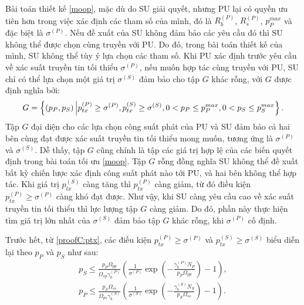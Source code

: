 \documentclass[../main.tex]{subfiles}
\begin{document}
Bài toán thiết kế \eqref{moop}, mặc dù do SU giải quyết, nhưng PU lại có quyền ưu tiên hơn trong việc xác định các tham số của mình, đó là $R_b^{(P)}$, $R_s^{(P)}$, $p_P^{max}$ và đặc biệt là $\sigma^{(P)}$. Nếu đề xuất của SU không đảm bảo các yêu cầu đó thì SU không thể được chọn cùng truyền với PU. Do đó, trong bài toán thiết kế của mình, SU không thể tùy ý lựa chọn các tham số. Khi PU xác định trước yêu cầu về xác suất truyền tin tối thiểu $\sigma^{(P)}$, nếu muốn hợp tác cùng truyền với PU, SU chỉ có thể lựa chọn một giá trị $\sigma^{(S)}$ đảm bảo cho tập $G$ khác rỗng, với $G$ được định nghĩa bởi:
\begin{equation}\label{proofC:set}
    G = \left\{\left(p_P, p_S\right)\Bigl|p_{tx}^{(P)} \geq \sigma^{(P)}, p_{tx}^{(S)} \geq \sigma^{(S)}, 0 < p_P \leq p_P^{max}, 0 < p_S \leq p_S^{max} \right\}.
\end{equation}
Tập $G$ đại diện cho các lựa chọn công suất phát của PU và SU đảm bảo cả hai bên cùng đạt được xác suất truyền tin tối thiểu mong muốn, tương ứng là $\sigma^{(P)}$ và $\sigma^{(S)}$. Dễ thấy, tập $G$ cũng chính là tập các giá trị hợp lệ của các biến quyết định trong bài toán tối ưu \eqref{moop}. Tập $G$ rỗng đồng nghĩa SU không thể đề xuất bất kỳ chiến lược xác định công suất phát nào tới PU, và hai bên không thể hợp tác. Khi giá trị $p_{tx}^{(S)}$ càng tăng thì $p_{tx}^{(P)}$ càng giảm, từ đó điều kiện $p_{tx}^{(P)} \geq \sigma^{(P)}$ càng khó đạt được. Như vậy, khi SU càng yêu cầu cao về xác suất truyền tin tối thiểu thì lực lượng tập $G$ càng giảm. Do đó, phần này thực hiện tìm giá trị lớn nhất của $\sigma^{(S)}$ đảm bảo tập $G$ khác rỗng, khi $\sigma^{(P)}$ cố định.

Trước hết, từ \eqref{proofC:ptx}, các điều kiện $p_{tx}^{(P)} \geq \sigma^{(P)}$ và $p_{tx}^{(S)} \geq \sigma^{(S)}$ biểu diễn lại theo $p_P$ và $p_S$ như sau:
\begin{subequations}\label{proofC:gp}
\begin{align}
p_S \leq \frac{p_P\Omega_{pp}}{\Omega_{sp}\gamma_b^{(P)}}
\left(\frac{1}{\sigma^{(P)}}\exp\left(-\frac{\gamma_b^{(P)}N_P}{p_P\Omega_{pp}}\right) - 1\right), \\
p_P \leq \frac{p_S\Omega_{ss}}{\Omega_{ps}\gamma_b^{(S)}}
\left(\frac{1}{\sigma^{(S)}}\exp\left(-\frac{\gamma_b^{(S)}N_S}{p_S\Omega_{ss}}\right) - 1\right).
\end{align}
\end{subequations}
\end{document}
